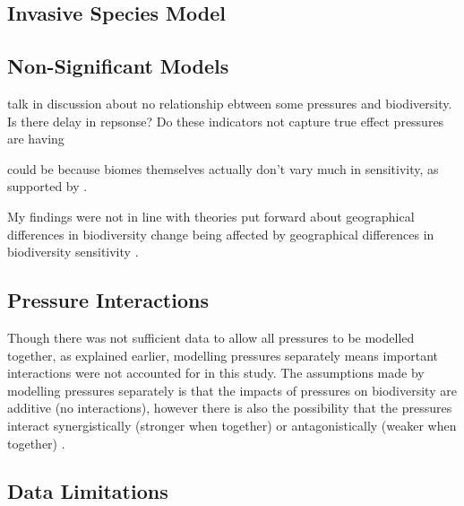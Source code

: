 \documentclass[11pt, a4paper, titlepage]{article}
\begin{document}
     
    \subsection*{Invasive Species Model}
    
	\subsection*{Non-Significant Models}
     
     talk in discussion about no relationship ebtween some pressures and biodiversity. Is there delay in repsonse? Do these indicators not capture true effect pressures are having
     
     could be because biomes themselves actually don't vary much in sensitivity, as supported by \citet{newbold2015global}.
     
     My findings were not in line with theories put forward about geographical differences in biodiversity change being affected by geographical differences in biodiversity sensitivity \citep{blowes2019geography}.
     
	\subsection*{Pressure Interactions}
	
	Though there was not sufficient data to allow all pressures to be modelled together, as explained earlier, modelling pressures separately means important interactions \citep{hansen2001global} were not accounted for in this study. The assumptions made by modelling pressures separately is that the impacts of pressures on biodiversity are additive (no interactions),  however there is also the possibility that the pressures interact synergistically (stronger when together) or antagonistically (weaker when together) \citep{bowler2020mapping}. 
	
	\subsection*{Data Limitations} %
	
\end{document}
